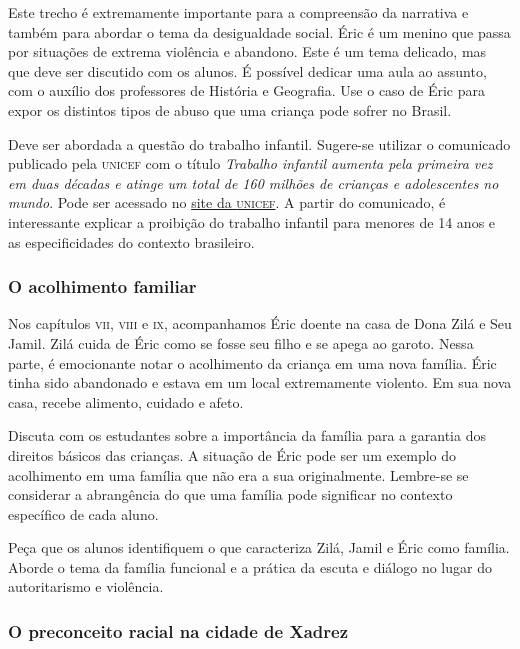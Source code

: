 \documentclass[11pt]{extarticle}
\begin{document}
Este trecho é extremamente importante para a compreensão da narrativa e também para abordar o tema da desigualdade social. Éric é um menino que passa por situações de extrema violência e abandono. Este é um tema delicado, mas que deve ser discutido com os alunos. É possível dedicar uma aula ao assunto, com o auxílio dos professores de História e Geografia. Use o caso de Éric para expor os distintos tipos de abuso que uma criança pode sofrer no Brasil. 


Deve ser abordada a questão do trabalho infantil. Sugere-se utilizar o comunicado publicado pela \textsc{unicef} com o título \textit{Trabalho infantil aumenta pela primeira vez em duas décadas e atinge um total de 160 milhões de crianças e adolescentes no mundo}. Pode ser acessado no \href{https://www.unicef.org/brazil/comunicados-de-imprensa/trabalho-infantil-aumenta-pela-primeira-vez-em-duas-decadas-e-atinge-um-total-de-160-milhoes-de-criancas-e-adolescentes-no-mundo}{site da \textsc{unicef}}. A partir do comunicado, é interessante explicar a proibição do trabalho infantil para menores de 14 anos e as especificidades do contexto brasileiro.

\subsubsection{O acolhimento familiar}

Nos capítulos \textsc{vii}, \textsc{viii} e \textsc{ix}, acompanhamos Éric doente na casa de Dona Zilá e Seu Jamil. Zilá cuida de Éric como se fosse seu filho e se apega ao garoto. Nessa parte, é emocionante notar o acolhimento da criança em uma nova família. Éric tinha sido abandonado e estava em um local extremamente violento. Em sua nova casa, recebe alimento, cuidado e afeto. 

Discuta com os estudantes sobre a importância da família para a garantia dos direitos básicos das crianças. A situação de Éric pode ser um exemplo do acolhimento em uma família que não era a sua originalmente. Lembre-se se considerar a abrangência do que uma família pode significar no contexto específico de cada aluno. 

Peça que os alunos identifiquem o que caracteriza Zilá, Jamil e Éric como família. Aborde o tema da família funcional e a prática da escuta e diálogo no lugar do autoritarismo e violência.

\subsubsection{O preconceito racial na cidade de Xadrez}
\end{document}
